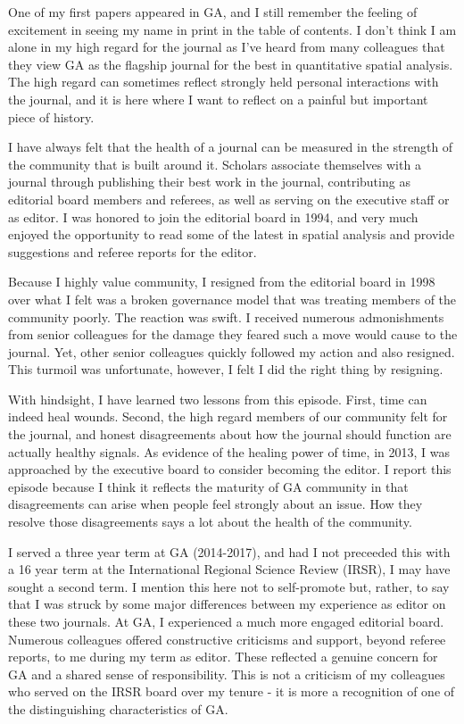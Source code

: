 \documentclass[11pt]{article}
\begin{document}
One of my first papers appeared in GA, and I still remember the feeling of
excitement in seeing my name in print in the table of contents. I don't think I
am alone in my high regard for the journal as I've heard from many colleagues
that they view GA as the flagship journal for the best in quantitative spatial
analysis. The high regard can sometimes reflect strongly held personal
interactions with the journal, and it is here where I want to reflect on a
painful but important piece of history.

I have always felt that the health of a journal can be measured in the strength
of the community that is built around it. Scholars associate themselves with a
journal through publishing their best work in the journal, contributing as
editorial board members and referees, as well as serving on the executive staff
or as editor. I was honored to join the editorial board in 1994, and very much
enjoyed the opportunity to read some of the latest in spatial analysis and
provide suggestions and referee reports for the editor.

Because I highly value community, I resigned from the editorial board in 1998
over what I felt was a broken governance model that was treating members of the
community poorly. The reaction was swift. I received numerous admonishments from
senior colleagues for the damage they feared such a move would cause to the
journal. Yet, other senior colleagues quickly followed my action and also resigned.
This turmoil was unfortunate, however, I felt I did the right thing by resigning.

With hindsight, I have learned two lessons from this episode. First, time can
indeed heal wounds. Second, the high regard members of our community felt for
the journal, and honest disagreements about how the journal should function are
actually healthy signals. As evidence of the healing power of time, in 2013, I
was approached by the executive board to consider becoming the editor. I report
this episode because I think it reflects the maturity of GA community in that
disagreements can arise when people feel strongly about an issue. How they
resolve those disagreements says a lot about the health of the community.

I served a three year term at GA (2014-2017), and had I not preceeded this with
a 16 year term at the International Regional Science Review (IRSR), I may have
sought a second term. I mention this here not to self-promote but, rather, to
say that I was struck by some major differences between my experience as editor
on these two journals. At GA, I experienced a much more engaged editorial board.
Numerous colleagues offered constructive criticisms and support, beyond referee
reports, to me during my term as editor. These reflected a genuine concern for
GA and a shared sense of responsibility. This is not a criticism of my
colleagues who served on the IRSR board over my tenure - it is more a
recognition of one of the distinguishing characteristics of GA.
\end{document}
